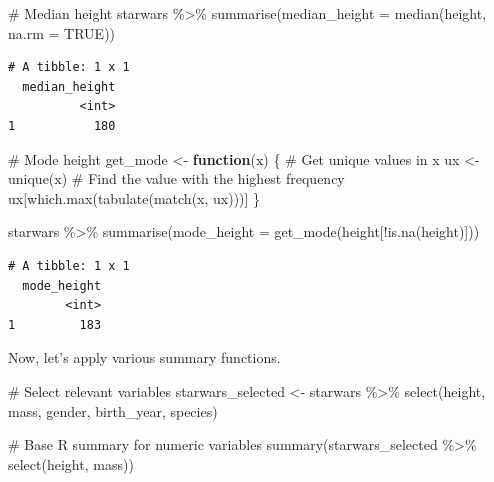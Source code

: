 \documentclass[
  man,
  floatsintext,
  longtable,
  nolmodern,
  notxfonts,
  notimes,
  colorlinks=true,linkcolor=blue,citecolor=blue,urlcolor=blue]{apa7}
\newenvironment{Shaded}{\begin{snugshade}}{\end{snugshade}}
\newcommand{\AttributeTok}[1]{\textcolor[rgb]{0.40,0.45,0.13}{#1}}
\newcommand{\CommentTok}[1]{\textcolor[rgb]{0.37,0.37,0.37}{#1}}
\newcommand{\ConstantTok}[1]{\textcolor[rgb]{0.56,0.35,0.01}{#1}}
\newcommand{\ControlFlowTok}[1]{\textcolor[rgb]{0.00,0.23,0.31}{\textbf{#1}}}
\newcommand{\FunctionTok}[1]{\textcolor[rgb]{0.28,0.35,0.67}{#1}}
\newcommand{\NormalTok}[1]{\textcolor[rgb]{0.00,0.23,0.31}{#1}}
\newcommand{\OtherTok}[1]{\textcolor[rgb]{0.00,0.23,0.31}{#1}}
\newcommand{\SpecialCharTok}[1]{\textcolor[rgb]{0.37,0.37,0.37}{#1}}
\begin{document}
\begin{Shaded}
\begin{Highlighting}[]
\CommentTok{\# Median height}
\NormalTok{starwars }\SpecialCharTok{\%\textgreater{}\%} \FunctionTok{summarise}\NormalTok{(}\AttributeTok{median\_height =} \FunctionTok{median}\NormalTok{(height, }\AttributeTok{na.rm =} \ConstantTok{TRUE}\NormalTok{))}
\end{Highlighting}
\end{Shaded}

\begin{verbatim}
# A tibble: 1 x 1
  median_height
          <int>
1           180
\end{verbatim}

\begin{Shaded}
\begin{Highlighting}[]
\CommentTok{\# Mode height}
\NormalTok{get\_mode }\OtherTok{\textless{}{-}} \ControlFlowTok{function}\NormalTok{(x) \{}
  \CommentTok{\# Get unique values in x}
\NormalTok{  ux }\OtherTok{\textless{}{-}} \FunctionTok{unique}\NormalTok{(x)                              }
  \CommentTok{\# Find the value with the highest frequency}
\NormalTok{  ux[}\FunctionTok{which.max}\NormalTok{(}\FunctionTok{tabulate}\NormalTok{(}\FunctionTok{match}\NormalTok{(x, ux)))]        }
\NormalTok{\}}

\NormalTok{starwars }\SpecialCharTok{\%\textgreater{}\%} \FunctionTok{summarise}\NormalTok{(}\AttributeTok{mode\_height =} \FunctionTok{get\_mode}\NormalTok{(height[}\SpecialCharTok{!}\FunctionTok{is.na}\NormalTok{(height)]))}
\end{Highlighting}
\end{Shaded}

\begin{verbatim}
# A tibble: 1 x 1
  mode_height
        <int>
1         183
\end{verbatim}

Now, let's apply various summary functions.

\begin{Shaded}
\begin{Highlighting}[]
\CommentTok{\# Select relevant variables}
\NormalTok{starwars\_selected }\OtherTok{\textless{}{-}}\NormalTok{ starwars }\SpecialCharTok{\%\textgreater{}\%} \FunctionTok{select}\NormalTok{(height, mass, gender, birth\_year, species)}

\CommentTok{\# Base R summary for numeric variables}
\FunctionTok{summary}\NormalTok{(starwars\_selected }\SpecialCharTok{\%\textgreater{}\%} \FunctionTok{select}\NormalTok{(height, mass))}
\end{Highlighting}
\end{Shaded}
\end{document}
